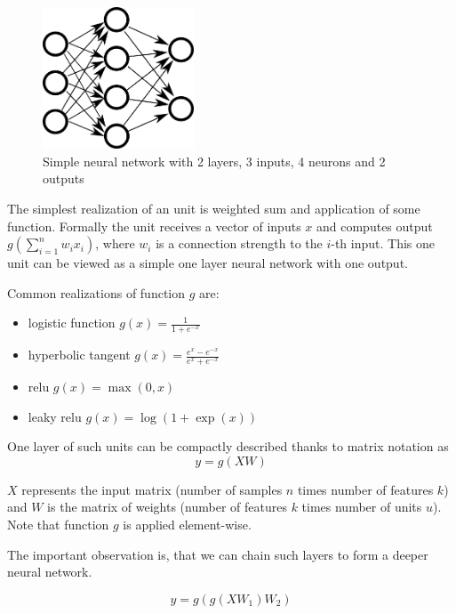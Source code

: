         \begin{figure}[h]
        \centerline{\includegraphics[width=0.4\textwidth]{images/neural_network}}
        \caption[Simple neural network with 2 layers, 3 inputs, 4 neurons and 2 outputs]{Simple neural network with 2 layers, 3 inputs, 4 neurons and 2 outputs\*} %
        \label{obr:siet}
        \end{figure}
        
        The simplest realization of an unit is weighted sum and application of some function. 
        Formally the unit receives a vector of inputs $x$ and computes output $g(\sum_{i=1}^n w_i x_i)$, 
        where $w_i$ is a connection strength to the $i$-th input.
        This one unit can be viewed as a simple one layer neural network with one output.
        
        Common realizations of function $g$ are: 
        \begin{itemize}
            \item logistic function $g(x) = \frac{1}{1+e^{-x}}$
            \item hyperbolic tangent $g(x)=\frac{e^x-e^{-x}}{e^x+e^{-x}}$
            \item relu $g(x) = \max(0,x)$ 
            \item leaky relu $g(x)=\log(1+\exp(x))$
        \end{itemize}
        
        One layer of such units can be compactly described thanks to matrix notation as
        $$y=g(X W)$$
        
        $X$ represents the input matrix (number of samples $n$ times number of features $k$) and $W$ is the matrix of weights (number of features $k$ times number of units $u$). Note that function $g$ is applied element-wise.
        
        The important observation is, that we can chain such layers to form a deeper neural network.
        
        $$y=g(g(X W_1) W_2)$$
        
